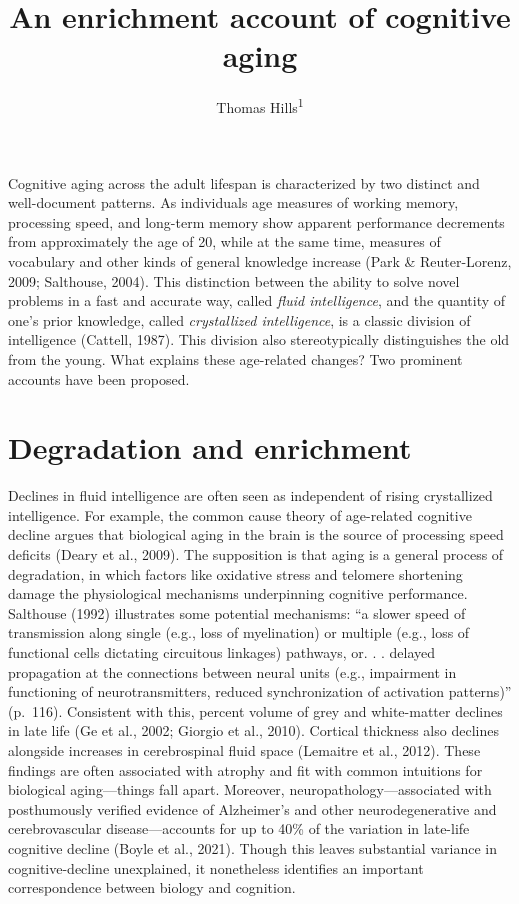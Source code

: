 \documentclass[
  man]{apa6}
\title{An enrichment account of cognitive aging}
\author{Thomas Hills\textsuperscript{1}}
\date{}
\affiliation{\vspace{0.5cm}\textsuperscript{1} University of Warwick}
\begin{document}
\maketitle

Cognitive aging across the adult lifespan is characterized by two distinct and well-document patterns. As individuals age measures of working memory, processing speed, and long-term memory show apparent performance decrements from approximately the age of 20, while at the same time, measures of vocabulary and other kinds of general knowledge increase (Park \& Reuter-Lorenz, 2009; Salthouse, 2004). This distinction between the ability to solve novel problems in a fast and accurate way, called \emph{fluid intelligence}, and the quantity of one's prior knowledge, called \emph{crystallized intelligence}, is a classic division of intelligence (Cattell, 1987). This division also stereotypically distinguishes the old from the young. What explains these age-related changes? Two prominent accounts have been proposed.

\hypertarget{degradation-and-enrichment}{%
\section{Degradation and enrichment}\label{degradation-and-enrichment}}

Declines in fluid intelligence are often seen as independent of rising crystallized intelligence. For example, the common cause theory of age-related cognitive decline argues that biological aging in the brain is the source of processing speed deficits (Deary et al., 2009). The supposition is that aging is a general process of degradation, in which factors like oxidative stress and telomere shortening damage the physiological mechanisms underpinning cognitive performance. Salthouse (1992) illustrates some potential mechanisms: ``a slower speed of transmission along single (e.g., loss of myelination) or multiple (e.g., loss of functional cells dictating circuitous linkages) pathways, or. . . delayed propagation at the connections between neural units (e.g., impairment in functioning of neurotransmitters, reduced synchronization of activation patterns)'' (p.~116). Consistent with this, percent volume of grey and white-matter declines in late life (Ge et al., 2002; Giorgio et al., 2010). Cortical thickness also declines alongside increases in cerebrospinal fluid space (Lemaitre et al., 2012). These findings are often associated with atrophy and fit with common intuitions for biological aging---things fall apart. Moreover, neuropathology---associated with posthumously verified evidence of Alzheimer's and other neurodegenerative and cerebrovascular disease---accounts for up to 40\% of the variation in late-life cognitive decline (Boyle et al., 2021). Though this leaves substantial variance in cognitive-decline unexplained, it nonetheless identifies an important correspondence between biology and cognition.
\end{document}
